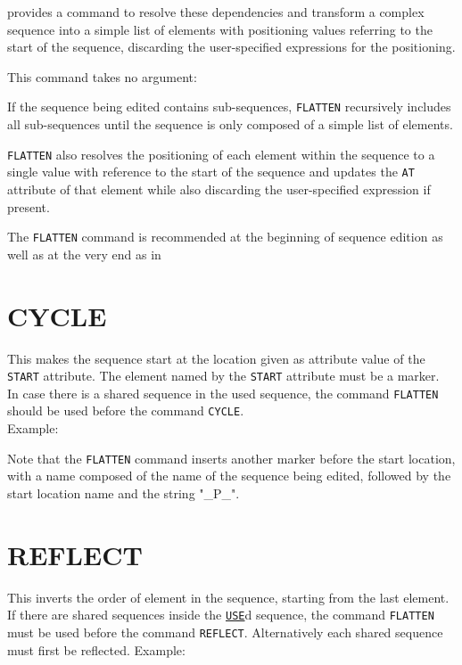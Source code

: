 \madx provides a command to resolve these dependencies and transform a complex 
sequence into a simple list of elements with positioning values referring to 
the start of the sequence, discarding the user-specified expressions for the 
positioning.

This command takes no argument: 

If the sequence being edited contains sub-sequences, \texttt{FLATTEN}
recursively includes all sub-sequences until the sequence is only
composed of a simple list of elements. 

\texttt{FLATTEN} also resolves the positioning of each element within
the sequence to a single value with reference to the start of the
sequence and updates the \texttt{AT} attribute of that element while
also discarding the user-specified expression if present.

The \texttt{FLATTEN} command is recommended at the beginning of sequence
edition as well as at the very end as in

\section{CYCLE}
\label{sec:cycle}
This makes the sequence start at the location given as attribute value
of the \texttt{START} attribute. The element named by the \texttt{START}
attribute must be a marker. \\  
In case there is a shared sequence in the used sequence, the
command \texttt{FLATTEN} should be used before the command
\texttt{CYCLE}. \\ 
Example:  

Note that the \texttt{FLATTEN} command inserts another marker before the
start location, with a name composed of the name of the sequence being
edited, followed by the start location name and the string "\_P\_". 

\section{REFLECT}
\label{sec:reflect}
This inverts the order of element in the sequence, starting from the
last element. \\ 
If there are shared sequences inside the
\hyperref[sec:use]{\texttt{USE}}d sequence,  
the command \texttt{FLATTEN} must be used before the command
\texttt{REFLECT}.   
Alternatively each shared sequence must first be reflected. Example:   


